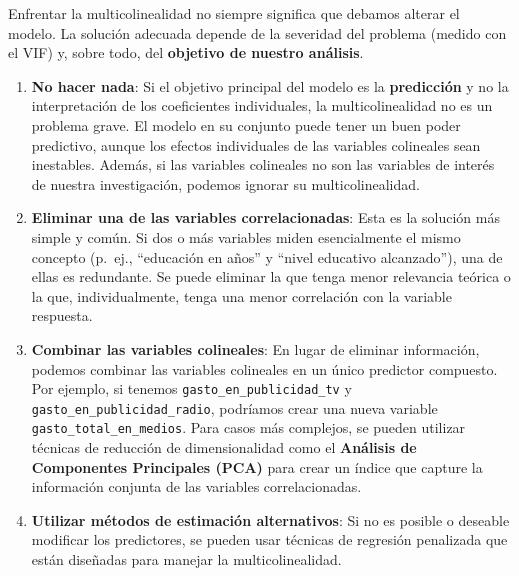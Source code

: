 \documentclass[
  letterpaper,
  DIV=11,
  numbers=noendperiod]{scrreprt}
\begin{document}
\begin{tcolorbox}[enhanced jigsaw, breakable, toprule=.15mm, bottomtitle=1mm, coltitle=black, colbacktitle=quarto-callout-note-color!10!white, titlerule=0mm, opacitybacktitle=0.6, bottomrule=.15mm, toptitle=1mm, title=\textcolor{quarto-callout-note-color}{\faInfo}\hspace{0.5em}{Soluciones a los problemas de multicolinealidad}, arc=.35mm, rightrule=.15mm, opacityback=0, colframe=quarto-callout-note-color-frame, leftrule=.75mm, left=2mm, colback=white]

Enfrentar la multicolinealidad no siempre significa que debamos alterar
el modelo. La solución adecuada depende de la severidad del problema
(medido con el VIF) y, sobre todo, del \textbf{objetivo de nuestro
análisis}.

\begin{enumerate}
\def\labelenumi{\arabic{enumi}.}
\item
  \textbf{No hacer nada}: Si el objetivo principal del modelo es la
  \textbf{predicción} y no la interpretación de los coeficientes
  individuales, la multicolinealidad no es un problema grave. El modelo
  en su conjunto puede tener un buen poder predictivo, aunque los
  efectos individuales de las variables colineales sean inestables.
  Además, si las variables colineales no son las variables de interés de
  nuestra investigación, podemos ignorar su multicolinealidad.
\item
  \textbf{Eliminar una de las variables correlacionadas}: Esta es la
  solución más simple y común. Si dos o más variables miden
  esencialmente el mismo concepto (p.~ej., ``educación en años'' y
  ``nivel educativo alcanzado''), una de ellas es redundante. Se puede
  eliminar la que tenga menor relevancia teórica o la que,
  individualmente, tenga una menor correlación con la variable
  respuesta.
\item
  \textbf{Combinar las variables colineales}: En lugar de eliminar
  información, podemos combinar las variables colineales en un único
  predictor compuesto. Por ejemplo, si tenemos
  \texttt{gasto\_en\_publicidad\_tv} y
  \texttt{gasto\_en\_publicidad\_radio}, podríamos crear una nueva
  variable \texttt{gasto\_total\_en\_medios}. Para casos más complejos,
  se pueden utilizar técnicas de reducción de dimensionalidad como el
  \textbf{Análisis de Componentes Principales (PCA)} para crear un
  índice que capture la información conjunta de las variables
  correlacionadas.
\item
  \textbf{Utilizar métodos de estimación alternativos}: Si no es posible
  o deseable modificar los predictores, se pueden usar técnicas de
  regresión penalizada que están diseñadas para manejar la
  multicolinealidad.


\end{enumerate}
\end{tcolorbox}
\end{document}
